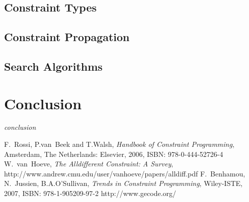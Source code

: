 \documentclass[10pt,
               a4paper,
               journal,
               ]{IEEEtran}
\begin{document}
	\subsection{Constraint Types}
	
	\subsection{Constraint Propagation}
	
	\subsection{Search Algorithms}
	
	\section{Conclusion}
	\textit{conclusion}
	
	\begin{thebibliography}{1}
		F.~Rossi, P.van~Beek and T.Walsh, \emph{Handbook of Constraint Programming}, Amsterdam, The Netherlands: Elsevier, 2006, ISBN: 978-0-444-52726-4
		W.~van~Hoeve, \emph{The Alldifferent Constraint: A Survey}, http://www.andrew.cmu.edu/user/vanhoeve/papers/alldiff.pdf
		F.~Benhamou, N.~Jussien, B.A.O'Sullivan, \emph{Trends in Constraint Programming}, Wiley-ISTE, 2007, ISBN: 978-1-905209-97-2
		http://www.gecode.org/
	\end{thebibliography}
\end{document}
